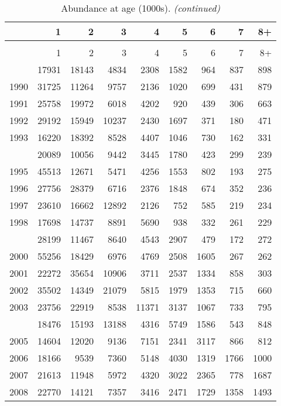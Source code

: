 \documentclass[
]{article}
\begin{document}
\begin{longtable}[t]{lrrrrrrrr}
\caption{\label{tab:NAA-table}Abundance at age (1000s).}\\
\toprule
  & 1 & 2 & 3 & 4 & 5 & 6 & 7 & 8+\\
\midrule
\endfirsthead
\caption[]{Abundance at age (1000s). \textit{(continued)}}\\
\toprule
  & 1 & 2 & 3 & 4 & 5 & 6 & 7 & 8+\\
\midrule
\endhead

\endfoot
\bottomrule
\endlastfoot
1989 & 17931 & 18143 & 4834 & 2308 & 1582 & 964 & 837 & 898\\
1990 & 31725 & 11264 & 9757 & 2136 & 1020 & 699 & 431 & 879\\
1991 & 25758 & 19972 & 6018 & 4202 & 920 & 439 & 306 & 663\\
1992 & 29192 & 15949 & 10237 & 2430 & 1697 & 371 & 180 & 471\\
1993 & 16220 & 18392 & 8528 & 4407 & 1046 & 730 & 162 & 331\\
\addlinespace
1994 & 20089 & 10056 & 9442 & 3445 & 1780 & 423 & 299 & 239\\
1995 & 45513 & 12671 & 5471 & 4256 & 1553 & 802 & 193 & 275\\
1996 & 27756 & 28379 & 6716 & 2376 & 1848 & 674 & 352 & 236\\
1997 & 23610 & 16662 & 12892 & 2126 & 752 & 585 & 219 & 234\\
1998 & 17698 & 14737 & 8891 & 5690 & 938 & 332 & 261 & 229\\
\addlinespace
1999 & 28199 & 11467 & 8640 & 4543 & 2907 & 479 & 172 & 272\\
2000 & 55256 & 18429 & 6976 & 4769 & 2508 & 1605 & 267 & 262\\
2001 & 22272 & 35654 & 10906 & 3711 & 2537 & 1334 & 858 & 303\\
2002 & 35502 & 14349 & 21079 & 5815 & 1979 & 1353 & 715 & 660\\
2003 & 23756 & 22919 & 8538 & 11371 & 3137 & 1067 & 733 & 795\\
\addlinespace
2004 & 18476 & 15193 & 13188 & 4316 & 5749 & 1586 & 543 & 848\\
2005 & 14604 & 12020 & 9136 & 7151 & 2341 & 3117 & 866 & 812\\
2006 & 18166 & 9539 & 7360 & 5148 & 4030 & 1319 & 1766 & 1000\\
2007 & 21613 & 11948 & 5972 & 4320 & 3022 & 2365 & 778 & 1687\\
2008 & 22770 & 14121 & 7357 & 3416 & 2471 & 1729 & 1358 & 1493\\

\end{longtable}
\end{document}
